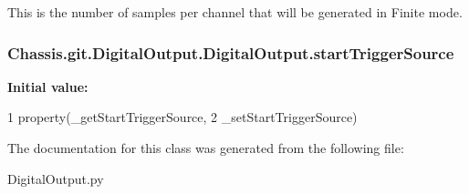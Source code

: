 This is the number of samples per channel that will be generated in Finite mode. 

\hypertarget{class_chassis_8git_1_1_digital_output_1_1_digital_output_a7c8d1ce1ce6bd23b7147fbe9ab7663c0}{
\subsubsection[{start\-Trigger\-Source}]{\setlength{\rightskip}{0pt plus 5cm}Chassis.\-git.\-Digital\-Output.\-Digital\-Output.\-start\-Trigger\-Source\hspace{0.3cm}{\ttfamily [static]}}}\label{class_chassis_8git_1_1_digital_output_1_1_digital_output_a7c8d1ce1ce6bd23b7147fbe9ab7663c0}
{\bfseries Initial value\-:}
\begin{DoxyCode}
1 property(\_getStartTriggerSource,
2             \_setStartTriggerSource)
\end{DoxyCode}


The documentation for this class was generated from the following file\-:\begin{DoxyCompactItemize}
\item 
Digital\-Output.\-py\end{DoxyCompactItemize}

